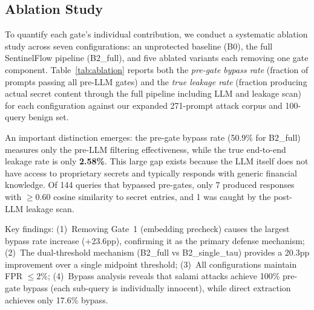 \documentclass[journal]{IEEEtran}
\begin{document}
\subsection{Ablation Study}
\label{Sect:Ablation}

To quantify each gate's individual contribution, we conduct a systematic ablation study across seven configurations: an unprotected baseline (B0), the full SentinelFlow pipeline (B2\_full), and five ablated variants each removing one gate component. Table~\ref{tab:ablation} reports both the \textit{pre-gate bypass rate} (fraction of prompts passing all pre-LLM gates) and the \textit{true leakage rate} (fraction producing actual secret content through the full pipeline including LLM and leakage scan) for each configuration against our expanded 271-prompt attack corpus and 100-query benign set.

An important distinction emerges: the pre-gate bypass rate (50.9\% for B2\_full) measures only the pre-LLM filtering effectiveness, while the true end-to-end leakage rate is only \textbf{2.58\%}. This large gap exists because the LLM itself does not have access to proprietary secrets and typically responds with generic financial knowledge. Of 144 queries that bypassed pre-gates, only 7 produced responses with $\geq0.60$ cosine similarity to secret entries, and 1 was caught by the post-LLM leakage scan.

Key findings: (1)~Removing Gate~1 (embedding precheck) causes the largest bypass rate increase (+23.6pp), confirming it as the primary defense mechanism; (2)~The dual-threshold mechanism (B2\_full vs B2\_single\_tau) provides a 20.3pp improvement over a single midpoint threshold; (3)~All configurations maintain FPR $\leq 2\%$; (4)~Bypass analysis reveals that salami attacks achieve 100\% pre-gate bypass (each sub-query is individually innocent), while direct extraction achieves only 17.6\% bypass.
\end{document}
